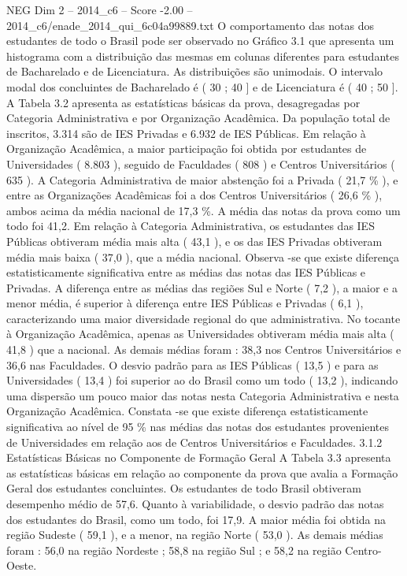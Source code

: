 \begin{textsample}{NEG Dim 2 – 2014\_c6 – Score -2.00 – 2014\_c6/enade\_2014\_qui\_6c04a99889.txt}
O comportamento das notas dos estudantes de todo o Brasil pode ser observado no Gráfico 3.1 que apresenta um histograma com a distribuição das mesmas em colunas diferentes para estudantes de Bacharelado e de Licenciatura.
As distribuições são unimodais.
O intervalo modal dos concluintes de Bacharelado é ( 30 ; 40 ] e de Licenciatura é ( 40 ; 50 ].
A Tabela 3.2 apresenta as estatísticas básicas da prova, desagregadas por Categoria Administrativa e por Organização Acadêmica.
Da população total de inscritos, 3.314 são de IES Privadas e 6.932 de IES Públicas.
Em relação à Organização Acadêmica, a maior participação foi obtida por estudantes de Universidades ( 8.803 ), seguido de Faculdades ( 808 ) e Centros Universitários ( 635 ).
A Categoria Administrativa de maior abstenção foi a Privada ( 21,7 \% ), e entre as Organizações Acadêmicas foi a dos Centros Universitários ( 26,6 \% ), ambos acima da média nacional de 17,3 \%.
A média das notas da prova como um todo foi 41,2.
Em relação à Categoria Administrativa, os estudantes das IES Públicas obtiveram média mais alta ( 43,1 ), e os das IES Privadas obtiveram média mais baixa ( 37,0 ), que a média nacional.
Observa -se que existe diferença estatisticamente significativa entre as médias das notas das IES Públicas e Privadas.
A diferença entre as médias das regiões Sul e Norte ( 7,2 ), a maior e a menor média, é superior à diferença entre IES Públicas e Privadas ( 6,1 ), caracterizando uma maior diversidade regional do que administrativa.
No tocante à Organização Acadêmica, apenas as Universidades obtiveram média mais alta ( 41,8 ) que a nacional.
As demais médias foram : 38,3 nos Centros Universitários e 36,6 nas Faculdades.
O desvio padrão para as IES Públicas ( 13,5 ) e para as Universidades ( 13,4 ) foi superior ao do Brasil como um todo ( 13,2 ), indicando uma dispersão um pouco maior das notas nesta Categoria Administrativa e nesta Organização Acadêmica.
Constata -se que existe diferença estatisticamente significativa ao nível de 95 \% nas médias das notas dos estudantes provenientes de Universidades em relação aos de Centros Universitários e Faculdades. 3.1.2 Estatísticas Básicas no Componente de Formação Geral A Tabela 3.3 apresenta as estatísticas básicas em relação ao componente da prova que avalia a Formação Geral dos estudantes concluintes.
Os estudantes de todo Brasil obtiveram desempenho médio de 57,6.
Quanto à variabilidade, o desvio padrão das notas dos estudantes do Brasil, como um todo, foi 17,9.
A maior média foi obtida na região Sudeste ( 59,1 ), e a menor, na região Norte ( 53,0 ).
As demais médias foram : 56,0 na região Nordeste ; 58,8 na região Sul ; e 58,2 na região Centro-Oeste.

\end{textsample}
